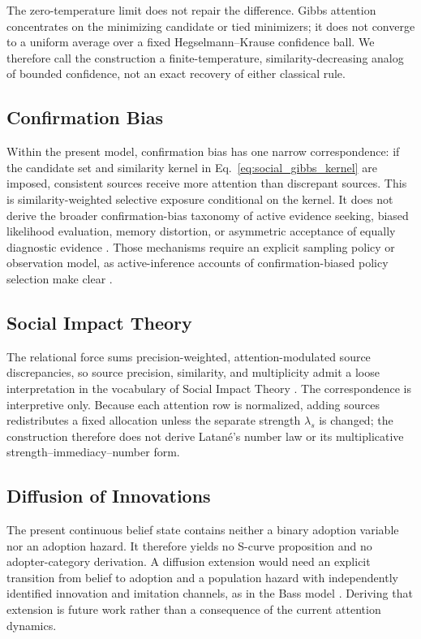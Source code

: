 \documentclass[12pt]{article}
\begin{document}
The zero-temperature limit does not repair the difference.  Gibbs attention concentrates on the minimizing candidate or tied minimizers; it does not converge to a uniform average over a fixed Hegselmann--Krause confidence ball.  We therefore call the construction a finite-temperature, similarity-decreasing analog of bounded confidence, not an exact recovery of either classical rule.

\subsection{Confirmation Bias}

Within the present model, confirmation bias has one narrow correspondence: if the candidate set and similarity kernel in Eq.~\eqref{eq:social_gibbs_kernel} are imposed, consistent sources receive more attention than discrepant sources.  This is similarity-weighted selective exposure conditional on the kernel.  It does not derive the broader confirmation-bias taxonomy of active evidence seeking, biased likelihood evaluation, memory distortion, or asymmetric acceptance of equally diagnostic evidence \citep{nickerson1998confirmation}.  Those mechanisms require an explicit sampling policy or observation model, as active-inference accounts of confirmation-biased policy selection make clear \citep{albarracin2022epistemic}.

\subsection{Social Impact Theory}

The relational force sums precision-weighted, attention-modulated source discrepancies, so source precision, similarity, and multiplicity admit a loose interpretation in the vocabulary of Social Impact Theory \citep{latane1981psychology}.  The correspondence is interpretive only.  Because each attention row is normalized, adding sources redistributes a fixed allocation unless the separate strength $\lambda_s$ is changed; the construction therefore does not derive Latan\'e's number law or its multiplicative strength--immediacy--number form.

\subsection{Diffusion of Innovations}

The present continuous belief state contains neither a binary adoption variable nor an adoption hazard.  It therefore yields no S-curve proposition and no adopter-category derivation.  A diffusion extension would need an explicit transition from belief to adoption and a population hazard with independently identified innovation and imitation channels, as in the Bass model \citep{Bass1969}.  Deriving that extension is future work rather than a consequence of the current attention dynamics.
\end{document}
